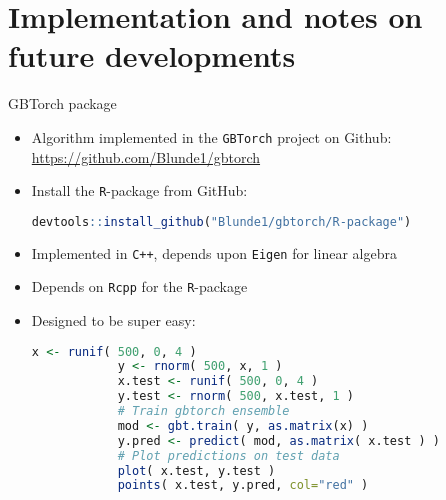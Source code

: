 
\section{Implementation and notes on future developments} 


\begin{frame}[fragile]{GBTorch package}
	\begin{itemize}
		\item Algorithm implemented in the \texttt{GBTorch} project on Github: \url{https://github.com/Blunde1/gbtorch}
		\item Install the \texttt{R}-package from GitHub:
		\begin{lstlisting}[language=R]
		devtools::install_github("Blunde1/gbtorch/R-package")
		\end{lstlisting}
		\item Implemented in \texttt{C++}, depends upon \texttt{Eigen} for linear algebra
		\item Depends on \texttt{Rcpp} for the \texttt{R}-package
		\item<2-> Designed to be super easy:
		\begin{lstlisting}[language=R]
			x <- runif( 500, 0, 4 )
			y <- rnorm( 500, x, 1 )
			x.test <- runif( 500, 0, 4 )
			y.test <- rnorm( 500, x.test, 1 )
			# Train gbtorch ensemble
			mod <- gbt.train( y, as.matrix(x) )
			y.pred <- predict( mod, as.matrix( x.test ) )
			# Plot predictions on test data
			plot( x.test, y.test )
			points( x.test, y.pred, col="red" )
		\end{lstlisting}
	\end{itemize}
	
\end{frame}

